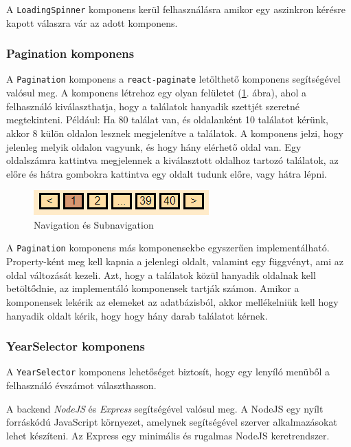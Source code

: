 A \texttt{LoadingSpinner} komponens kerül felhasználásra amikor egy aszinkron kérésre kapott válaszra vár az adott komponens.

\subsubsection{Pagination komponens}

A \texttt{Pagination} komponens a \texttt{react-paginate} letölthető komponens segítségével valósul meg. A komponens létrehoz egy olyan felületet (\ref{fig:pagination}. ábra), ahol a felhasználó kiválaszthatja, hogy a találatok hanyadik szettjét szeretné megtekinteni. Például: Ha 80 találat van, és oldalanként 10 találatot kérünk, akkor 8 külön oldalon lesznek megjelenítve a találatok. A komponens jelzi, hogy jelenleg melyik oldalon vagyunk, és hogy hány elérhető oldal van. Egy oldalszámra kattintva megjelennek a kiválasztott oldalhoz tartozó találatok, az előre és hátra gombokra kattintva egy oldalt tudunk előre, vagy hátra lépni.

\begin{figure}[h]
\centering
\includegraphics[scale=1]{images/application/pagination.png}
\caption{Navigation és Subnavigation}
\label{fig:pagination}
\end{figure}

A \texttt{Pagination} komponens más komponensekbe egyszerűen implementálható. Pro\-per\-ty-ként meg kell kapnia a jelenlegi oldalt, valamint egy függvényt, ami az oldal változását kezeli. Azt, hogy a találatok közül hanyadik oldalnak kell betöltődnie, az implementáló komponensek tartják számon. Amikor a komponensek lekérik az elemeket az adatbázisból, akkor mellékelniük kell hogy hanyadik oldalt kérik, hogy hogy hány darab találatot kérnek.

\subsubsection{YearSelector komponens}

A \texttt{YearSelector} komponens lehetőséget biztosít, hogy egy lenyíló menüből a felhasználó évszámot választhasson.


A backend \textit{NodeJS} és \textit{Express} segítségével valósul meg. A NodeJS egy nyílt forráskódú JavaScript környezet, amelynek segítségével szerver alkalmazásokat lehet készíteni. Az Express egy minimális és rugalmas NodeJS keretrendszer.

